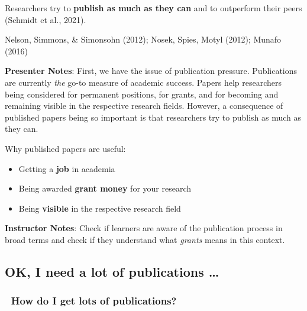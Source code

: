 \documentclass[
  letterpaper,
  DIV=11,
  numbers=noendperiod]{scrartcl}
\providecommand{\tightlist}{%
  \setlength{\itemsep}{0pt}\setlength{\parskip}{0pt}}
\begin{document}
\begin{tcolorbox}[enhanced jigsaw, arc=.35mm, bottomrule=.15mm, bottomtitle=1mm, breakable, colback=white, colbacktitle=quarto-callout-warning-color!10!white, colframe=quarto-callout-warning-color-frame, coltitle=black, left=2mm, leftrule=.75mm, opacityback=0, opacitybacktitle=0.6, rightrule=.15mm, title=\textcolor{quarto-callout-warning-color}{\faExclamationTriangle}\hspace{0.5em}{Consequence: ``Publish or Perish'' culture}, titlerule=0mm, toprule=.15mm, toptitle=1mm]

Researchers try to \textbf{publish as much as they can} and to
outperform their peers (Schmidt et al., 2021).

\end{tcolorbox}

Nelson, Simmons, \& Simonsohn (2012); Nosek, Spies, Motyl (2012); Munafo
(2016)

\textbf{Presenter Notes}: First, we have the issue of publication
pressure. Publications are currently \emph{the} go-to measure of
academic success. Papers help researchers being considered for permanent
positions, for grants, and for becoming and remaining visible in the
respective research fields. However, a consequence of published papers
being so important is that researchers try to publish as much as they
can.

Why published papers are useful:

\begin{itemize}
\tightlist
\item
  Getting a \textbf{job} in academia
\item
  Being awarded \textbf{grant money} for your research
\item
  Being \textbf{visible} in the respective research field
\end{itemize}

\textbf{Instructor Notes}: Check if learners are aware of the
publication process in broad terms and check if they understand what
\emph{grants} means in this context.

\subsection{OK, I need a lot of publications
\ldots{}}\label{ok-i-need-a-lot-of-publications}

\subsubsection{🤔 How do I get lots of
publications?}\label{how-do-i-get-lots-of-publications}
\end{document}
